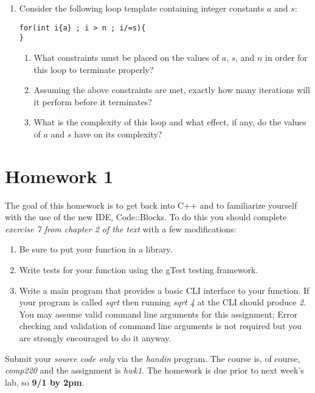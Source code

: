 \documentclass[10pt]{article}
\begin{document}
\begin{enumerate}
\item Consider the following loop template containing integer constants $a$ and $s$:
\begin{center}
\begin{lstlisting}
for(int i{a} ; i > n ; i/=s){
}
\end{lstlisting}
\end{center}
\begin{enumerate}
  \item What constraints must be placed on the values of $a$, $s$, and $n$ in order for this loop to terminate properly?
  \vspace{2in}
  \item Assuming the above constraints are met, exactly how many iterations will it perform before it terminates?
  \vspace{2in}
  \item What is the complexity of this loop and what effect, if any, do the values of $a$ and $s$ have on its complexity?
  \newpage \thispagestyle{empty}
\end{enumerate}

\end{enumerate}
\section{Homework 1}

The goal of this homework is to get back into C++ and to familiarize yourself with the use of the new IDE, Code::Blocks. To do this you should complete \textit{exercise 7 from chapter 2 of the text} with a few modifications:
\begin{enumerate}
\item Be sure to put your function in a library.
\item Write tests for your function using the gTest testing framework.
\item Write a main program that provides a basic CLI interface to your function. If your program is called \textit{sqrt} then running \textit{sqrt 4} at the CLI should produce \textit{2}. You may assume valid command line arguments for this assignment;  Error checking and validation of command line arguments is not required but you are strongly encouraged to do it anyway.
\end{enumerate}

Submit your \textit{source code only} via the \textit{handin} program. The course is, of course, \textit{comp220} and the assignment is \textit{hwk1}. The homework is due prior to next week's lab, so \textbf{9/1 by 2pm}.
\end{document}
